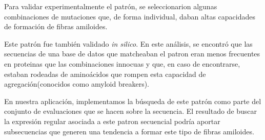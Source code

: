 % 



Para validar experimentalmente el patrón, se seleccionarion algunas combinaciones de mutaciones que, de forma individual, daban altas capacidades de formación de fibras amiloides. 

Este patrón fue también validado \textit{in silico}. En este análisis, se encontró que las secuencias de una base de datos que matcheaban el patron eran menos frecuentes en proteinas que las combinaciones innocuas y que, en caso de encontrarse, estaban rodeadas de aminoácidos que 
rompen esta capacidad de agregación(conocidos como amyloid breakers).



En nuestra aplicación, implementamos la búsqueda de este patrón como parte del conjunto de evaluaciones que se hacen sobre la secuencia. El resultado de buscar la expresión regular asociada a este patron secuencial podría aportar subsecuencias
que generen una tendencia a formar este tipo de fibras amiloides.

